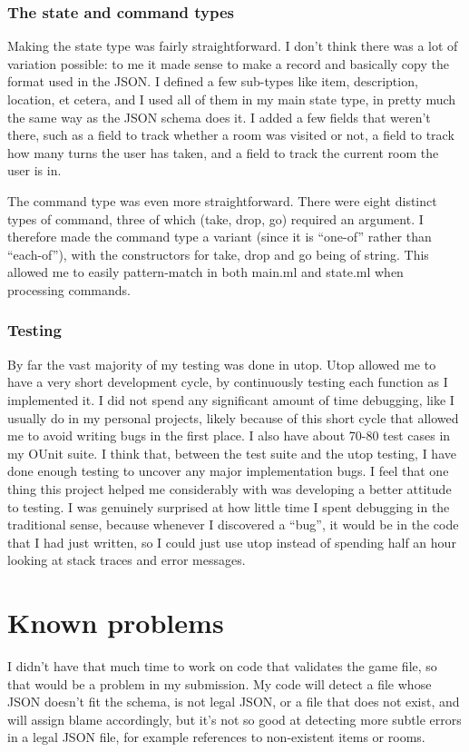 \subsubsection{The state and command types}
Making the state type was fairly straightforward. I don't think there was a lot of variation possible: to me it made sense to make a record and basically copy the format used in the JSON. I defined a few sub-types like item, description, location, et cetera, and I used all of them in my main state type, in pretty much the same way as the JSON schema does it. I added a few fields that weren't there, such as a field to track whether a room was visited or not, a field to track how many turns the user has taken, and a field to track the current room the user is in.

The command type was even more straightforward. There were eight distinct types of command, three of which (take, drop, go) required an argument. I therefore made the command type a variant (since it is ``one-of'' rather than ``each-of''), with the constructors for take, drop and go being of string. This allowed me to easily pattern-match in both main.ml and state.ml when processing commands.

\subsubsection{Testing}
By far the vast majority of my testing was done in utop. Utop allowed me to have a very short development cycle, by continuously testing each function as I implemented it. I did not spend any significant amount of time debugging, like I usually do in my personal projects, likely because of this short cycle that allowed me to avoid writing bugs in the first place. I also have about 70-80 test cases in my OUnit suite. I think that, between the test suite and the utop testing, I have done enough testing to uncover any major implementation bugs. I feel that one thing this project helped me considerably with was developing a better attitude to testing. I was genuinely surprised at how little time I spent debugging in the traditional sense, because whenever I discovered a ``bug'', it would be in the code that I had just written, so I could just use utop instead of spending half an hour looking at stack traces and error messages.

\section{Known problems}
I didn't have that much time to work on code that validates the game file, so that would be a problem in my submission. My code will detect a file whose JSON doesn't fit the schema, is not legal JSON, or a file that does not exist, and will assign blame accordingly, but it's not so good at detecting more subtle errors in a legal JSON file, for example references to non-existent items or rooms.

